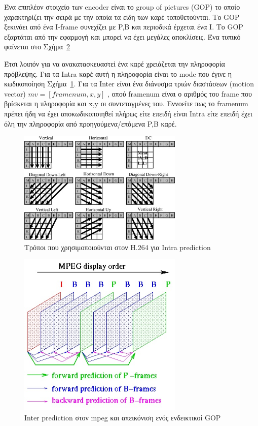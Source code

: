 \indent Ένα επιπλέον στοιχείο των encoder είναι το group of pictures (GOP) το οποίο χαρακτηρίζει την σειρά με την οποία τα είδη των καρέ τοποθετούνται. Το GOP ξεκινάει από ένα I-frame συνεχίζει με P,B και περιοδικά έρχεται ένα Ι. Το GOP εξαρτάται από την εφαρμογή και μπορεί να έχει μεγάλες αποκλίσεις. Ένα τυπικό φαίνεται στο Σχήμα~\ref{fig:gop}

\indent Έτσι λοιπόν για να ανακατασκευαστεί ένα καρέ χρειάζεται την πληροφορία πρόβλεψης. Για τα Intra καρέ αυτή η πληροφορία είναι το mode που έγινε η κωδικοποίηση Σχήμα~\ref{fig:intrapred}. Για τα Inter είναι ένα διάνυσμα τριών διαστάσεων (motion vector) $mv = [ framenum , x , y]$ ,  οπού framenum είναι ο αριθμός του frame που βρίσκεται η πληροφορία και x,y οι συντεταγμένες του. Εννοείτε πως το framenum πρέπει ήδη να έχει αποκωδικοποιηθεί πλήρως είτε επειδή είναι Intra είτε επειδή έχει όλη την πληροφορία από προηγούμενα/επόμενα P,B καρέ.

\begin{figure}[H]
  \centering
    \includegraphics[width=0.7\textwidth]{chapter2/intrapred.jpg}
  \caption{Τρόποι που χρησιμοποιούνται στον Η.264 για Intra prediction}
    \label{fig:intrapred}
\end{figure}

\begin{figure}[H]
  \centering
    \includegraphics[width=0.7\textwidth]{chapter2/gop.jpg}
  \caption{Inter prediction στον mpeg και απεικόνιση ενός ενδεικτικοί GOP }
  \label{fig:gop}
\end{figure}

